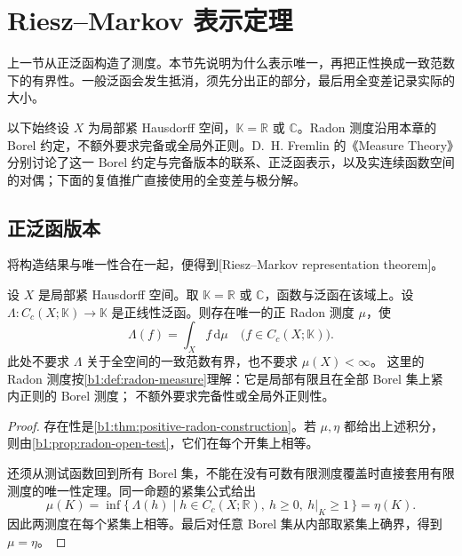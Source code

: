 \section{Riesz–Markov 表示定理}
\label{b1:sec:1104}

上一节从正泛函构造了测度。本节先说明为什么表示唯一，再把正性换成一致范数下的有界性。一般泛函会发生抵消，须先分出正的部分，最后用全变差记录实际的大小。

\ProseParagraphBreak

以下始终设 \(X\) 为局部紧 Hausdorff 空间，\(\mathbb K=\mathbb R\) 或 \(\mathbb C\)。Radon 测度沿用本章的 Borel 约定，不额外要求完备或全局外正则。D.~H. Fremlin 的《Measure Theory》\cite[416F, 436J--K, and 437I]{Fremlin2016Measure}分别讨论了这一 Borel 约定与完备版本的联系、正泛函表示，以及实连续函数空间的对偶；下面的复值推广直接使用的全变差与极分解。


\subsection{正泛函版本}
\label{b1:subsec:110401}

将构造结果与唯一性合在一起，便得到[Riesz--Markov representation theorem]。

\begin{theorem}\label{b1:thm:riesz-markov-positive}
设 \(X\) 是局部紧 Hausdorff 空间。取 \(\mathbb K=\mathbb R\) 或 \(\mathbb C\)，函数与泛函在该域上。设 \(\Lambda:C_c(X;\mathbb K)\rightarrow\mathbb K\) 是正线性泛函。则存在唯一的正 Radon 测度 \(\mu\)，使
\[
 \Lambda(f)=\int_X f\,\mathrm d\mu
 \quad\bigl(f\in C_c(X;\mathbb K)\bigr).
\]
此处不要求 \(\Lambda\) 关于全空间的一致范数有界，也不要求 \(\mu(X)<\infty\)。
这里的 Radon 测度按\cref{b1:def:radon-measure}理解：它是局部有限且在全部 Borel 集上紧内正则的 Borel 测度；
不额外要求完备性或全局外正则性。
\end{theorem}
\begin{proof}
存在性是\cref{b1:thm:positive-radon-construction}。若 \(\mu,\eta\) 都给出上述积分，则由\cref{b1:prop:radon-open-test}，它们在每个开集上相等。

还须从测试函数回到所有 Borel 集，不能在没有可数有限测度覆盖时直接套用有限测度的唯一性定理。同一命题的紧集公式给出
\[
 \mu(K)=\inf\{\,\Lambda(h)\mid h\in C_c(X;\mathbb R),\ h\geq0,\ h|_K\geq1\,\}
 =\eta(K).
\]
因此两测度在每个紧集上相等。最后对任意 Borel 集从内部取紧集上确界，得到 \(\mu=\eta\)。
\end{proof}

